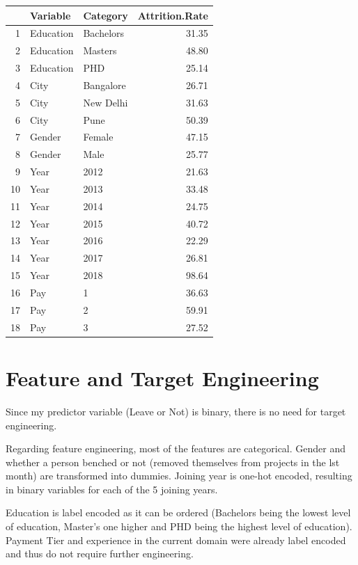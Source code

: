 \documentclass[11pt,preprint, authoryear]{elsarticle}
\let\origtable\table
\let\endorigtable\endtable
\renewenvironment{table}[1][2] {
    \expandafter\origtable\expandafter[H]
} {
    \endorigtable
}
\numberwithin{equation}{section}
\numberwithin{figure}{section}
\numberwithin{table}{section}
\begin{document}
\begin{table}[H]
\centering
\begin{tabular}{rllr}
  \hline
 & Variable & Category & Attrition.Rate \\ 
  \hline
1 & Education & Bachelors & 31.35 \\ 
  2 & Education & Masters & 48.80 \\ 
  3 & Education & PHD & 25.14 \\ 
  4 & City & Bangalore & 26.71 \\ 
  5 & City & New Delhi & 31.63 \\ 
  6 & City & Pune & 50.39 \\ 
  7 & Gender & Female & 47.15 \\ 
  8 & Gender & Male & 25.77 \\ 
  9 & Year & 2012 & 21.63 \\ 
  10 & Year & 2013 & 33.48 \\ 
  11 & Year & 2014 & 24.75 \\ 
  12 & Year & 2015 & 40.72 \\ 
  13 & Year & 2016 & 22.29 \\ 
  14 & Year & 2017 & 26.81 \\ 
  15 & Year & 2018 & 98.64 \\ 
  16 & Pay & 1 & 36.63 \\ 
  17 & Pay & 2 & 59.91 \\ 
  18 & Pay & 3 & 27.52 \\ 
   \hline
\end{tabular}
\caption{Attrition Rate Across Categories \label{tab1}} 
\end{table}

\hypertarget{feature-and-target-engineering}{%
\section*{Feature and Target
Engineering}\label{feature-and-target-engineering}}

Since my predictor variable (Leave or Not) is binary, there is no need
for target engineering.

Regarding feature engineering, most of the features are categorical.
Gender and whether a person benched or not (removed themselves from
projects in the lst month) are transformed into dummies. Joining year is
one-hot encoded, resulting in binary variables for each of the 5 joining
years.

Education is label encoded as it can be ordered (Bachelors being the
lowest level of education, Master's one higher and PHD being the highest
level of education). Payment Tier and experience in the current domain
were already label encoded and thus do not require further engineering.
\end{document}
